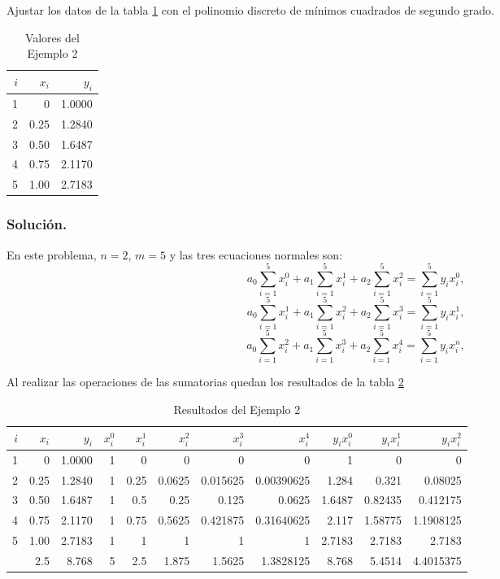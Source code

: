 \begin{example}{\rm Ajustar los datos de la tabla \ref{table:minimosCuadrados2} con el polinomio discreto de mínimos cuadrados de segundo grado.
    \begin{table}[ht]
      \begin{center}
		\begin{tabular}{|r|r|r|}
	  		\hline
	  		\rowcolor[gray]{0.9} $i$ & $x_i$ & $y_i$\\\hline
	      		1 & 0 & 1.0000\\
	      		2 & 0.25 & 1.2840\\
	      		3 & 0.50 & 1.6487\\
	      		4 & 0.75 & 2.1170\\
	      		5 & 1.00 & 2.7183\\
	      		\hline
			\end{tabular}
			\caption{Valores del Ejemplo 2}
			\label{table:minimosCuadrados2}
      \end{center}
    \end{table}   
  \subsubsection*{Solución.} 
	En este problema, $n=2$, $m=5$ y las tres ecuaciones normales son:
	$$a_0\sum_{i=1}^5 x_i^0 + a_1\sum_{i=1}^5 x_i^1 + a_2\sum_{i=1}^5 x_i^2 = \sum_{i=1}^5 y_ix_i^0,$$
	$$a_0\sum_{i=1}^5 x_i^1 + a_1\sum_{i=1}^5 x_i^2 + a_2\sum_{i=1}^5 x_i^3 = \sum_{i=1}^5 y_ix_i^1,$$
	$$a_0\sum_{i=1}^5 x_i^2 + a_1\sum_{i=1}^5 x_i^3 + a_2\sum_{i=1}^5 x_i^4 = \sum_{i=1}^5 y_ix_i^n,$$
 
	Al realizar las operaciones de las sumatorias quedan los resultados de la tabla \ref{table:minimosCuadrados3}
	\begin{table}[ht]
	  \begin{center}
	    \begin{tabular}{|r|r|r|r|r|r|r|r|r|r|r|}
	      \hline
	      \rowcolor[gray]{0.9} $i$ & $x_i$ & $y_i$ & $x_i^0$ & $x_i^1$ & $x_i^2$ & $x_i^3$ & $x_i^4$ & $y_ix_i^0$ & $y_ix_i^1$ & $y_ix_i^2$ \\
	      \hline
		  1 & 0 & 1.0000 & 1 & 0 & 0 & 0 & 0 & 1 & 0 & 0\\
		  2 & 0.25 & 1.2840 & 1 & 0.25 & 0.0625 & 0.015625 & 0.00390625 & 1.284 & 0.321 & 0.08025\\
		  3 & 0.50 & 1.6487 & 1 & 0.5 & 0.25 & 0.125 & 0.0625 & 1.6487 & 0.82435 & 0.412175\\
		  4 & 0.75 & 2.1170 & 1 & 0.75 & 0.5625 & 0.421875 & 0.31640625 & 2.117 & 1.58775 & 1.1908125\\
		  5 & 1.00 & 2.7183 & 1 & 1 & 1 & 1 & 1 & 2.7183 & 2.7183 & 2.7183\\\hline
		    & 2.5 & 8.768 & 5 & 2.5 & 1.875 & 1.5625 & 1.3828125 & 8.768 & 5.4514 & 4.4015375\\
		  \hline
	    \end{tabular}
	    \caption{Resultados del Ejemplo 2}
	    \label{table:minimosCuadrados3}
	  \end{center}
	\end{table}   
	
}
\end{example}
